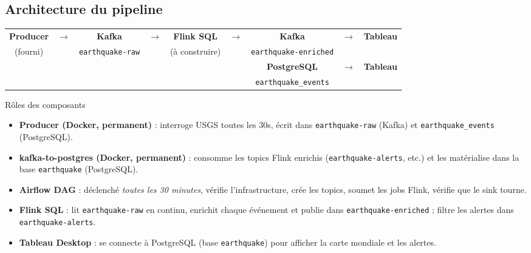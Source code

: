 \documentclass[12pt,a4paper]{article}
\begin{document}
\subsection*{Architecture du pipeline}

\begin{center}
\begin{tabular}{ccccccccc}
  \textbf{\color{pgblue}Producer} &
  $\to$ &
  \textbf{\color{kafkared}Kafka} &
  $\to$ &
  \textbf{\color{flinkblue}Flink SQL} &
  $\to$ &
  \textbf{\color{kafkared}Kafka} &
  $\to$ &
  \textbf{Tableau} \\[0.2cm]
  \small(fourni) & &
  \small\texttt{earthquake-raw} & &
  \small(à construire) & &
  \small\texttt{earthquake-enriched} & & \\[0.3cm]
  & & & & & & \textbf{\color{pgblue}PostgreSQL} & $\to$ & \textbf{Tableau} \\
  & & & & & & \small\texttt{earthquake\_events} & & \\
\end{tabular}
\end{center}

\vspace{0.5cm}

\begin{infobox}{Rôles des composants}
  \begin{itemize}
    \item \textbf{Producer (Docker, permanent)} : interroge USGS toutes les 30s,
          écrit dans \texttt{earthquake-raw} (Kafka) et \texttt{earthquake\_events} (PostgreSQL).
    \item \textbf{kafka-to-postgres (Docker, permanent)} : consomme les topics Flink enrichis
          (\texttt{earthquake-alerts}, etc.) et les matérialise dans la base \texttt{earthquake} (PostgreSQL).
    \item \textbf{Airflow DAG} : déclenché \emph{toutes les 30 minutes},
          vérifie l'infrastructure, crée les topics, soumet les jobs Flink, vérifie que le sink tourne.
    \item \textbf{Flink SQL} : lit \texttt{earthquake-raw} en continu,
          enrichit chaque événement et publie dans \texttt{earthquake-enriched} ;
          filtre les alertes dans \texttt{earthquake-alerts}.
    \item \textbf{Tableau Desktop} : se connecte à PostgreSQL
          (base \texttt{earthquake}) pour afficher la carte mondiale et les alertes.
  \end{itemize}
\end{infobox}
\end{document}
